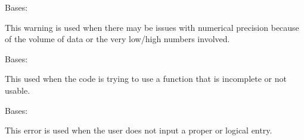 \documentclass[letterpaper,10pt,english]{sphinxmanual}
\begin{document}

\begin{fulllineitems}
\label{\detokenize{docstrings/ifa_smeargle.core.error:ifa_smeargle.core.error.ImprecisionWarning}}
Bases: {\hyperref[\detokenize{docstrings/ifa_smeargle.core.error:ifa_smeargle.core.error.Ifas_Warning}]{}}

This warning is used when there may be issues with numerical
precision because of the volume of data or the very low/high
numbers involved.

\end{fulllineitems}


\begin{fulllineitems}
\label{\detokenize{docstrings/ifa_smeargle.core.error:ifa_smeargle.core.error.IncompleteError}}
Bases: {\hyperref[\detokenize{docstrings/ifa_smeargle.core.error:ifa_smeargle.core.error.Ifas_BaseException}]{}}

This used when the code is trying to use a function that is
incomplete or not usable.

\end{fulllineitems}


\begin{fulllineitems}
\label{\detokenize{docstrings/ifa_smeargle.core.error:ifa_smeargle.core.error.InputError}}
Bases: {\hyperref[\detokenize{docstrings/ifa_smeargle.core.error:ifa_smeargle.core.error.Ifas_Exception}]{}}

This error is used when the user does not input a proper or
logical entry.

\end{fulllineitems}
\end{document}
